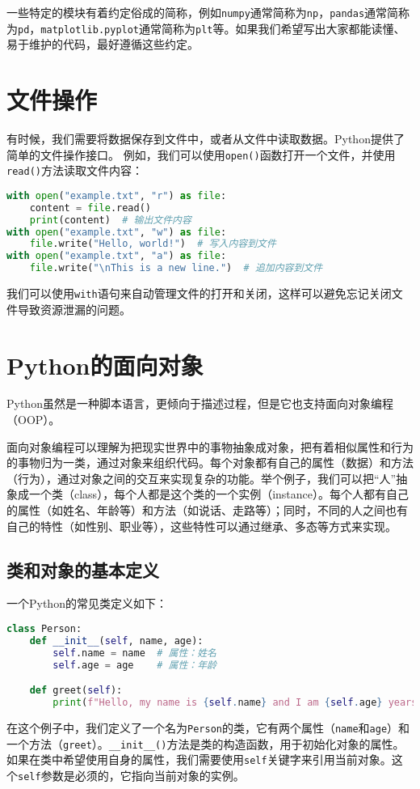 \documentclass[../main.tex]{subfiles}
\begin{document}
一些特定的模块有着约定俗成的简称，例如\texttt{numpy}通常简称为\texttt{np}，\texttt{pandas}通常简称为\texttt{pd}，\texttt{matplotlib.pyplot}通常简称为\texttt{plt}等。如果我们希望写出大家都能读懂、易于维护的代码，最好遵循这些约定。

\section{文件操作}

有时候，我们需要将数据保存到文件中，或者从文件中读取数据。Python提供了简单的文件操作接口。
例如，我们可以使用\texttt{open()}函数打开一个文件，并使用\texttt{read()}方法读取文件内容：
\begin{lstlisting}[language=python]
with open("example.txt", "r") as file:
    content = file.read()
    print(content)  # 输出文件内容
with open("example.txt", "w") as file:
    file.write("Hello, world!")  # 写入内容到文件
with open("example.txt", "a") as file:
    file.write("\nThis is a new line.")  # 追加内容到文件
\end{lstlisting}

我们可以使用\texttt{with}语句来自动管理文件的打开和关闭，这样可以避免忘记关闭文件导致资源泄漏的问题。

\section{Python的面向对象}

Python虽然是一种脚本语言，更倾向于描述过程，但是它也支持面向对象编程（OOP）。

面向对象编程可以理解为把现实世界中的事物抽象成对象，把有着相似属性和行为的事物归为一类，通过对象来组织代码。每个对象都有自己的属性（数据）和方法（行为），通过对象之间的交互来实现复杂的功能。举个例子，我们可以把“人”抽象成一个类（class），每个人都是这个类的一个实例（instance）。每个人都有自己的属性（如姓名、年龄等）和方法（如说话、走路等）；同时，不同的人之间也有自己的特性（如性别、职业等），这些特性可以通过继承、多态等方式来实现。

\subsection{类和对象的基本定义}
一个Python的常见类定义如下：
\begin{lstlisting}[language=python]
class Person:
    def __init__(self, name, age):
        self.name = name  # 属性：姓名
        self.age = age    # 属性：年龄

    def greet(self):
        print(f"Hello, my name is {self.name} and I am {self.age} years old.")
\end{lstlisting}
在这个例子中，我们定义了一个名为\texttt{Person}的类，它有两个属性（\texttt{name}和\texttt{age}）和一个方法（\texttt{greet}）。\texttt{\_\_init\_\_()}方法是类的构造函数，用于初始化对象的属性。如果在类中希望使用自身的属性，我们需要使用\texttt{self}关键字来引用当前对象。这个\texttt{self}参数是必须的，它指向当前对象的实例。
\end{document}
